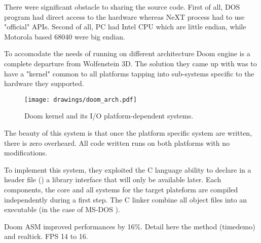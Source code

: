 There were significant obstacle to sharing the source code. First of all, DOS program had direct access to the hardware whereas NeXT process had to use "official" APIs. Second of all, PC had Intel CPU which are little endian, while Motorola based 68040 were big endian.\\
\par
{}
\par
{}
\par
{}
\par
To accomodate the needs of running on different architecture Doom engine is a complete departure from Wolfenstein 3D. The solution they came up with was to have a "kernel" common to all platforms tapping into sub-systems specific to the hardware they supported.\\
\par
\begin{figure}[H]
\centering
\texttt{[image: drawings/doom\_arch.pdf]}
\caption{Doom kernel and its I/O platform-dependent systems.}
\end{figure}
\par
{}
The beauty of this system is that once the platform specific system are written, there is zero overheard. All code written runs on both platforms with no modifications.
\par
To implement this system, they exploited the C language ability to declare in a header file () a library interface that will only be available later. Each components, the core and all systems for the target plateform are compiled independently during a first step. The C linker combine all object files into an executable (in the case of MS-DOS ).\\
\par
{}
\par
Doom ASM improved performances by 16\%. Detail here the method (timedemo) and realtick. FPS 14 to 16.\\
\par


\par

\par

